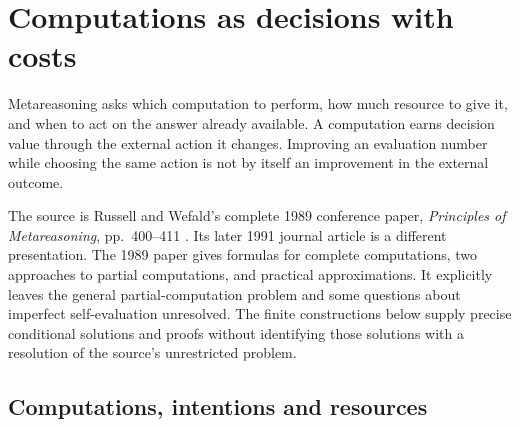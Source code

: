 \chapter{Computations as decisions with costs}
\label{sec:p17-metareasoning}

Metareasoning asks which computation to perform, how much resource to
give it, and when to act on the answer already available. A computation
earns decision value through the external action it changes. Improving
an evaluation number while choosing the same action is not by itself
an improvement in the external outcome.

The source is Russell and Wefald's complete 1989 conference paper,
\emph{Principles of Metareasoning}, pp.~400--411
\cite{RussellWefald1989KRMetareasoning}. Its later 1991 journal article
is a different presentation. The 1989 paper gives formulas for complete
computations, two approaches to partial computations, and practical
approximations. It explicitly leaves the general partial-computation
problem and some questions about imperfect self-evaluation unresolved.
The finite constructions below supply precise conditional solutions
and proofs without identifying those solutions with a resolution of
the source's unrestricted problem.

\section{Computations, intentions and resources}
\label{sec:p17-meta-actions}

